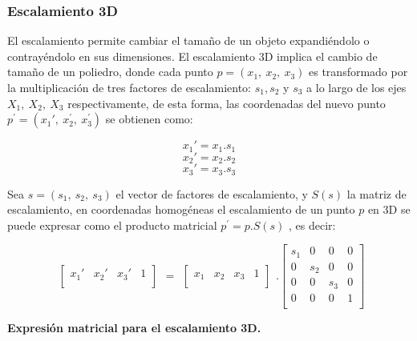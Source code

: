 \subsubsection{Escalamiento 3D}
El escalamiento permite cambiar el tamaño de un objeto expandiéndolo o contrayéndolo en sus dimensiones.
El escalamiento 3D implica el cambio de tamaño de un poliedro, donde cada punto $p = (x_{1},\ x_{2},\ x_{3})$ es transformado por la multiplicación de tres factores de escalamiento: $s_{1}, s_{2}$ y $s_{3}$ a lo largo de los ejes $X_{1},\ X_{2},\ X_{3}$ respectivamente, de esta forma, las coordenadas del nuevo punto $p^{\prime} = (x_{1}{ \prime},\ x_{2}^{ \prime},\ x_{3}^{ \prime})$ se obtienen como:

$$x_{1}{\prime} = x_{1}.s_{1}$$
$$x_{2}{\prime} = x_{2}.s_{2}$$
$$x_{3}{\prime} = x_{3}.s_{3}$$

Sea $s = (s_{1},\ s_{2},\ s_{3})$ el vector de factores de escalamiento, y $S(s)$ la matriz de
escalamiento, en coordenadas homogéneas el escalamiento de un punto $p$ en 3D se puede expresar como el producto matricial
$p^{\prime} = p.S(s)$ , es decir:

\begin{equation}
\begin{array}{rccl}
\left[
\begin{array}{rccl}
x_{1}{\prime} & x_{2}{\prime} & x_{3}{\prime} & 1\\
\end{array}
\right]
\end{array}
=
\begin{array}{rccl}
\left[
\begin{array}{rccl}
x_{1} & x_{2} & x_{3} & 1\\
\end{array}
\right]
\end{array} 
.
\left[
\begin{array}{rccl}
s_{1} & 0 & 0 & 0\\
0 & s_{2} & 0 & 0\\
0 & 0 & s_{3} & 0\\
0 & 0 & 0 & 1\\
\end{array}
\right]   
\end{equation}


\begin{center}
\textbf{\footnotesize{Expresión matricial para el escalamiento 3D.}}
\end{center}


